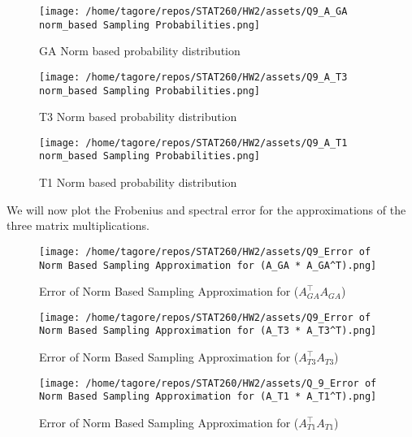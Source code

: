 \documentclass{article}
\begin{document}
\begin{figure}[H]
    \centering
    \texttt{[image: /home/tagore/repos/STAT260/HW2/assets/Q9\_A\_GA norm\_based Sampling Probabilities.png]}
    \caption{GA Norm based probability distribution}
    \label{fig:GA_norm_based_prob}
\end{figure}

\begin{figure}[H]
    \centering
    \texttt{[image: /home/tagore/repos/STAT260/HW2/assets/Q9\_A\_T3 norm\_based Sampling Probabilities.png]}
    \caption{T3 Norm based probability distribution}
    \label{fig:T3_norm_based_prob}
\end{figure}

\begin{figure}[H]
    \centering
    \texttt{[image: /home/tagore/repos/STAT260/HW2/assets/Q9\_A\_T1 norm\_based Sampling Probabilities.png]}
    \caption{T1 Norm based probability distribution}
    \label{fig:T1_norm_based_prob}
\end{figure}

We will now plot the Frobenius and spectral error for the approximations of the three matrix multiplications.

\begin{figure}[H]
    \centering
    \texttt{[image: /home/tagore/repos/STAT260/HW2/assets/Q9\_Error of Norm Based Sampling Approximation for (A\_GA * A\_GA^T).png]}
    \caption{Error of Norm Based Sampling Approximation for (\(A_{GA}^\top A_{GA}\))}
    \label{fig:GA_norm_based_error}
\end{figure}

\begin{figure}[H]
    \centering
    \texttt{[image: /home/tagore/repos/STAT260/HW2/assets/Q9\_Error of Norm Based Sampling Approximation for (A\_T3 * A\_T3^T).png]}
    \caption{Error of Norm Based Sampling Approximation for (\(A_{T3}^\top A_{T3}\))}
    \label{fig:T3s_norm_based_error}
\end{figure}

\begin{figure}[H]
    \centering
    \texttt{[image: /home/tagore/repos/STAT260/HW2/assets/Q\_9\_Error of Norm Based Sampling Approximation for (A\_T1 * A\_T1^T).png]}
    \caption{Error of Norm Based Sampling Approximation for (\(A_{T1}^\top A_{T1}\))}
    \label{fig:T1_norm_based_error}
\end{figure}
\end{document}
